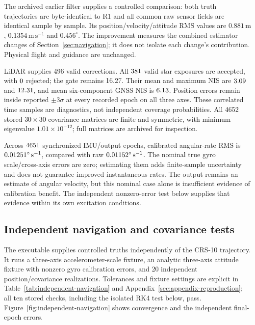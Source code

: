 The archived earlier filter supplies a controlled comparison: both truth trajectories are byte-identical to R1 and all common raw sensor fields are identical sample by sample. Its position/velocity/attitude RMS values are $0.881\,\mathrm{m}$, $0.1354\,\mathrm{m\,s^{-1}}$ and $0.456^\circ$. The improvement measures the combined estimator changes of Section~\ref{sec:navigation}; it does not isolate each change's contribution. Physical flight and guidance are unchanged.

LiDAR supplies 496 valid corrections. All $381$ valid star exposures are accepted, with $0$ rejected; the gate remains 16.27. Their mean and maximum NIS are $3.09$ and $12.31$, and mean six-component GNSS NIS is $6.13$. Position errors remain inside reported $\pm3\sigma$ at every recorded epoch on all three axes. These correlated time samples are diagnostics, not independent coverage probabilities. All 4652 stored $30\times30$ covariance matrices are finite and symmetric, with minimum eigenvalue $1.01\times10^{-12}$; full matrices are archived for inspection.

Across $4651$ synchronized IMU/output epochs, calibrated angular-rate RMS is $0.01251^\circ\,\mathrm{s^{-1}}$, compared with raw $0.01152^\circ\,\mathrm{s^{-1}}$. The nominal true gyro scale/cross-axis errors are zero; estimating them adds finite-sample uncertainty and does not guarantee improved instantaneous rates. The output remains an estimate of angular velocity, but this nominal case alone is insufficient evidence of calibration benefit. The independent nonzero-error test below supplies that evidence within its own excitation conditions.

\subsection{Independent navigation and covariance tests}
The executable  supplies controlled truths independently of the CRS-10 trajectory. It runs a three-axis accelerometer-scale fixture, an analytic three-axis attitude fixture with nonzero gyro calibration errors, and 20 independent position/covariance realizations. Tolerances and fixture settings are explicit in Table~\ref{tab:independent-navigation} and Appendix~\ref{sec:appendix-reproduction}; all ten stored checks, including the isolated RK4 test below, pass. Figure~\ref{fig:independent-navigation} shows convergence and the independent final-epoch errors.

